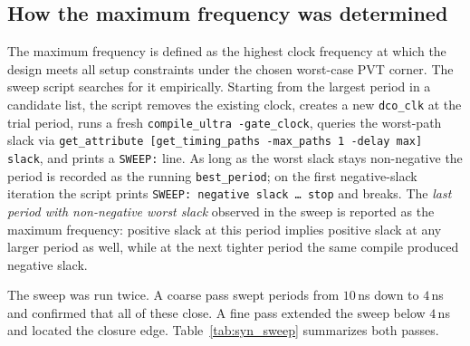 \subsection{How the maximum frequency was determined}

The maximum frequency is defined as the highest clock frequency at
which the design meets all setup constraints under the chosen
worst-case PVT corner. The sweep script searches for it
empirically. Starting from the largest period in a candidate list, the
script removes the existing clock, creates a new \texttt{dco\_clk} at
the trial period, runs a fresh \texttt{compile\_ultra -gate\_clock},
queries the worst-path slack via
\texttt{get\_attribute [get\_timing\_paths -max\_paths 1 -delay max] slack},
and prints a \texttt{SWEEP:} line. As long as the worst slack stays
non-negative the period is recorded as the running \texttt{best\_period};
on the first negative-slack iteration the script prints
\texttt{SWEEP: negative slack \dots\ stop} and breaks. The
\emph{last period with non-negative worst slack} observed in the sweep
is reported as the maximum frequency: positive slack at this period
implies positive slack at any larger period as well, while at the next
tighter period the same compile produced negative slack.

The sweep was run twice. A coarse pass swept periods from $10$\,ns
down to $4$\,ns and confirmed that all of these close. A fine pass
extended the sweep below $4$\,ns and located the closure edge.
Table~\ref{tab:syn_sweep} summarizes both passes.

